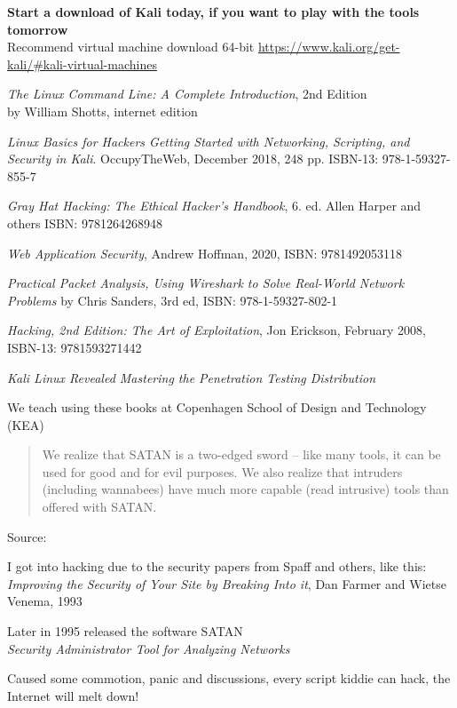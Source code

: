 \documentclass[Screen16to9,17pt]{foils}
\begin{document}

{\bf Start a download of Kali today, if you want to play with the tools tomorrow}\\
Recommend virtual machine download 64-bit \url{https://www.kali.org/get-kali/#kali-virtual-machines}


\begin{list2}
\item \emph{The Linux Command Line: A Complete Introduction}, 2nd Edition\\
 by William Shotts, internet edition 
\item \emph{Linux Basics for Hackers Getting Started with Networking, Scripting, and Security in Kali}. OccupyTheWeb, December 2018, 248 pp. ISBN-13: 978-1-59327-855-7
\item \emph{Gray Hat Hacking: The Ethical Hacker's Handbook}, 6. ed. Allen Harper and others ISBN: 9781264268948
\item \emph{Web Application Security}, Andrew Hoffman, 2020, ISBN: 9781492053118
\item \emph{Practical Packet Analysis, Using Wireshark to Solve Real-World Network Problems}
by Chris Sanders, 3rd ed, ISBN: 978-1-59327-802-1
\item \emph{Hacking, 2nd Edition: The Art of Exploitation}, Jon Erickson, February 2008, ISBN-13: 9781593271442
\item \emph{Kali Linux Revealed Mastering the Penetration Testing Distribution}\\
\end{list2}


We teach using these books at Copenhagen School of Design and Technology (KEA)


\begin{quote}
We realize that SATAN is a two-edged sword -- like
many tools, it can be used for good and for evil
purposes. We also realize that intruders (including
wannabees) have much more capable (read intrusive)
tools than offered with SATAN.
\end{quote}
Source:

\begin{list2}
\item I got into hacking due to the security papers from Spaff and others, like this:
\emph{Improving the Security of Your Site by Breaking Into it}, Dan Farmer and Wietse Venema, 1993
\item Later in 1995 released the software SATAN\\
\emph{Security Administrator Tool for Analyzing Networks}
\item Caused some commotion, panic and discussions, every script kiddie can hack, the Internet will melt down!
\end{list2}
\end{document}
